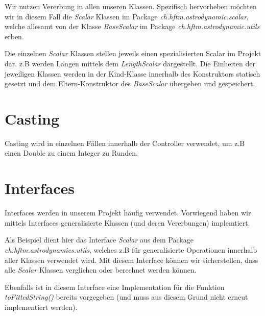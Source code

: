 Wir nutzen Vererbung in allen unseren Klassen. Spezifisch hervorheben möchten wir in diesem Fall die \textit{Scalar} Klassen im Package \textit{ch.hftm.astrodynamic.scalar}, welche allesamt von der Klasse \textit{BaseScalar} im Package \textit{ch.hftm.astrodynamic.utils} erben.

Die einzelnen \textit{Scalar} Klassen stellen jeweils einen spezialisierten Scalar im Projekt dar. z.B werden Längen mittels dem \textit{LengthScalar} dargestellt.
Die Einheiten der jeweiligen Klassen werden in der Kind-Klasse innerhalb des Konstruktors statisch gesetzt und dem Eltern-Konstruktor des \textit{BaseScalar} übergeben und gespeichert.

\section{Casting}

Casting wird in einzelnen Fällen innerhalb der Controller verwendet, um z.B einen Double zu einem Integer zu Runden.

\section{Interfaces}

Interfaces werden in unserem Projekt häufig verwendet. Vorwiegend haben wir mittels Interfaces generalisierte Klassen (und deren Vererbungen) implemtiert.

Als Beispiel dient hier das Interface \textit{Scalar} aus dem Package \textit{ch.hftm.astrodynamics.utils}, welches z.B für generalisierte Operationen innerhalb aller Klassen verwendet wird. Mit diesem Interface können wir sicherstellen, dass alle \textit{Scalar} Klassen verglichen oder berechnet werden können.

Ebenfalls ist in diesem Interface eine Implementation für die Funktion \textit{toFittedString()} bereits vorgegeben (und muss aus diesem Grund nicht erneut implementiert werden).

